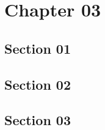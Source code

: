 \chapter{Chapter 03}
\section{Section 01}
\lipsum[1-5]
\section{Section 02}
\lipsum[1-5]
\section{Section 03}
\lipsum[1-5]